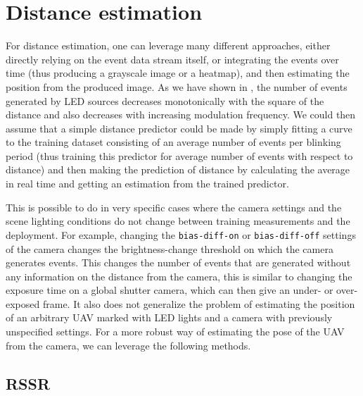 
\chapter{Distance estimation\label{chap:p3p}}

For distance estimation, one can leverage many different approaches, either directly relying on the event data stream itself, or integrating the
events over time (thus producing a grayscale image or a heatmap), and then estimating the position from the produced image. As we have shown in , the number of events
generated by \ac{LED} sources decreases monotonically with the square of the distance and also decreases with increasing modulation frequency.
We could then assume that a simple distance predictor could be made by simply fitting a curve to the training dataset consisting of an average
number of events per blinking period (thus training this predictor for average number of events with respect to distance) and then making the prediction of distance by calculating the average in real time and getting an estimation from the trained predictor.

This is possible to do in very specific cases where the camera settings and the scene lighting conditions do not change between training measurements
and the deployment. For example, changing the \texttt{bias-diff-on} or \texttt{bias-diff-off} settings of the camera changes the brightness-change threshold on
which the camera generates events.
This changes the number of events that are generated without any information on the distance from the camera, this is similar to changing the exposure
time on a global shutter camera, which can then give an under- or over-exposed frame.
It also does not generalize the problem of estimating the position of an arbitrary \ac{UAV} marked with \ac{LED} lights and a camera with previously unspecified
settings. For a more robust way of estimating the pose of the \ac{UAV} from the camera, we can leverage the following methods.

\section{RSSR}

